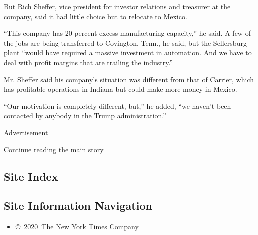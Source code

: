 But Rich Sheffer, vice president for investor relations and treasurer at
the company, said it had little choice but to relocate to Mexico.

``This company has 20 percent excess manufacturing capacity,'' he said.
A few of the jobs are being transferred to Covington, Tenn., he said,
but the Sellersburg plant ``would have required a massive investment in
automation. And we have to deal with profit margins that are trailing
the industry.''

Mr. Sheffer said his company's situation was different from that of
Carrier, which has profitable operations in Indiana but could make more
money in Mexico.

``Our motivation is completely different, but,'' he added, ``we haven't
been contacted by anybody in the Trump administration.''

Advertisement

\protect\hyperlink{after-bottom}{Continue reading the main story}

\hypertarget{site-index}{%
\subsection{Site Index}\label{site-index}}

\hypertarget{site-information-navigation}{%
\subsection{Site Information
Navigation}\label{site-information-navigation}}

\begin{itemize}
\tightlist
\item
  \href{https://help.nytimes.com/hc/en-us/articles/115014792127-Copyright-notice}{©~2020~The
  New York Times Company}
\end{itemize}

